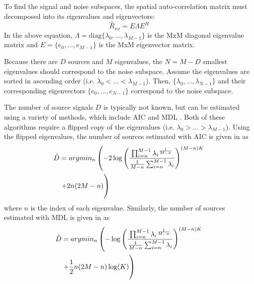 \documentclass[conference]{IEEEtran}
\begin{document}
		To find the signal and noise subspaces, the spatial auto-correlation matrix must decomposed into its eigenvalues and eigenvectors:
	\begin{equation}
		\hat{R}_{xx} = E{\Lambda}E^H
		\label{eigenvalue_decomposition_of_Rxx}
	\end{equation}
	In the above equation, $\Lambda = \text{diag}\{\lambda_0,...,\lambda_{M-1}\}$ is the MxM diagonal eigenvalue matrix and $E=\{e_0,...,e_{M-1}\}$ is the MxM eigenvector matrix.
	
	Because there are $D$ sources and $M$ eigenvalues, the $N = M - D$ smallest eigenvalues should correspond to the noise subspace. Assume the eigenvalues are sorted in ascending order (i.e. $\lambda_0 < ... < \lambda_{M-1}$). Then, $\{\lambda_0,...,\lambda_{N-1}\}$ and their corresponding eigenvectors $\{e_0,...,e_{N-1}\}$ correspond to the noise subspace.
	
	The number of source signals $D$ is typically not known, but can be estimated using a variety of methods, which include AIC and MDL \cite{num_sources_est_salman}. Both of these algorithms require a flipped copy of the eigenvalues (i.e. $\lambda_0 > ... > \lambda_{M-1}$). Using the flipped eigenvalues, the number of sources estimated with AIC is given in \cite{num_sources_est_salman} as
	\begin{equation}
		\begin{split}
		\hat{D} &= argmin_n\left(-2\log\left(\frac{\prod_{i=n}^{M-1}{{\lambda_i}^{\frac{1}{M-n}}}}{\frac{1}{M - n}\sum_{i=n}^{M-1}{\lambda_i}}\right)^{(M-n)K}\right. \\
		& \left. + 2n(2M - n) \vphantom{-2\log\left(\frac{\prod_{i=n}^{M-1}{{\lambda_i}^{\frac{1}{M-k}}}}{\frac{1}{M - n}\sum_{i=n}^{M-1}{\lambda_i}}\right)^{(M-n)K}} \right)
		\end{split}
		\label{AIC_num_sources}
	\end{equation}
	where $n$ is the index of each eigenvalue. Similarly, the number of sources estimated with MDL is given in \cite{num_sources_est_salman} as
	\begin{equation}
		\begin{split}
		\hat{D} &= argmin_n\left(-\log\left(\frac{\prod_{i=n}^{M-1}{{\lambda_i}^{\frac{1}{M-n}}}}{\frac{1}{M - n}\sum_{i=n}^{M-1}{\lambda_i}}\right)^{(M-n)K}\right. \\
		& \left. + \frac{1}{2}n(2M - n)\log(K) \vphantom{-\log\left(\frac{\prod_{i=n}^{M-1}{{\lambda_i}^{\frac{1}{M-k}}}}{\frac{1}{M - n}\sum_{i=n}^{M-1}{\lambda_i}}\right)^{(M-n)K}} \right)
		\end{split}
		\label{MDL_num_sources}
	\end{equation}
	
\end{document}
